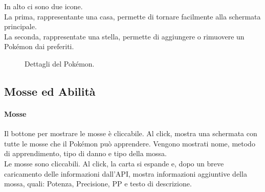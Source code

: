 \documentclass[a4paper,11pt]{article}
\begin{document}
In alto ci sono due icone.\\
La prima, rappresentante una casa, permette di tornare facilmente alla schermata principale.\\
La seconda, rappresentate una stella, permette di aggiungere o rimuovere un Pokémon dai preferiti.\\

  \begin{figure}[hp!]
    \centering
	\caption{Dettagli del Pokémon.}
\end{figure}

\newpage

\subsection{Mosse ed Abilità}
\paragraph{Mosse}
Il bottone per mostrare le mosse è cliccabile. Al click, mostra una schermata con tutte le mosse che il Pokémon può apprendere. Vengono mostrati nome, metodo di apprendimento, tipo di danno e tipo della mossa.\\
Le mosse sono cliccabili. Al click, la carta si espande e, dopo un breve caricamento delle informazioni dall’API, mostra informazioni aggiuntive della mossa, quali: Potenza, Precisione, PP e testo di descrizione.
\end{document}

